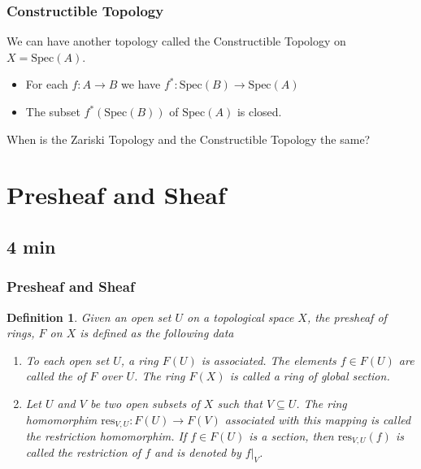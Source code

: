 \documentclass[pdf]{beamer}
\newtheorem{defn}[theorem]{Definition}
\begin{document}
\begin{frame}
    \frametitle{Constructible Topology}
    We can have another topology called the Constructible Topology on $X = \text{Spec}(A)$.
    \begin{itemize}
        \item For each $f: A \rightarrow B$ we have $f^*: \text{Spec}(B) \rightarrow \text{Spec}(A)$
        \item The subset $f^*(\text{Spec}(B))$ of $\text{Spec}(A)$ is closed.
    \end{itemize}
\end{frame}

\begin{frame}
    When is the Zariski Topology and the Constructible Topology the same?
\end{frame}

\section{Presheaf and Sheaf}
\subsection{4 min}

\begin{frame}
    \frametitle{Presheaf and Sheaf}

    \begin{defn}
    Given an open set $U$ on a topological space $X$, the \textit{presheaf of rings}, $F$ on $X$ is defined as the following data
\begin{enumerate}
    \item To each open set $U$, a ring $F(U)$ is associated. The elements $f \in F(U)$ are called the  of $F$ over $U$. The ring $F(X)$ is called a ring of \textit{global section}.  
    \item Let $U$ and $V$ be two open subsets of $X$ such that $V \subseteq U$. The ring homomorphim $\text{res}_{V,U}: F(U) \rightarrow F(V)$ associated with this mapping is called the \textit{restriction homomorphim}. If $f \in F(U)$ is a section, then $\text{res}_{V,U}(f)$ is called the restriction of $f$ and is denoted by $f|_{V}$.
    \end{enumerate}
    \end{defn}
\end{frame}
\end{document}
